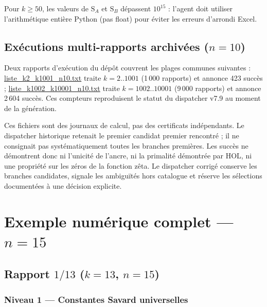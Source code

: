 \documentclass[11pt,a4paper]{article}
\newcommand{\SA}{\mathrm{S}_A}
\newcommand{\SB}{\mathrm{S}_B}
\begin{document}
\begin{boitealerte}
Pour $k \ge 50$, les valeurs de $\SA$ et $\SB$ dépassent $10^{15}$ : l'agent
doit utiliser l'arithmétique entière Python (pas float) pour éviter les erreurs
d'arrondi Excel.
\end{boitealerte}

\subsection{Exécutions multi-rapports archivées ($n=10$)}

Deux rapports d'exécution du dépôt couvrent les plages communes suivantes :
\url{liste_k2_k1001_n10.txt} traite $k=2..1001$ (1\,000 rapports) et
annonce 423 succès ; \url{liste_k1002_k10001_n10.txt} traite
$k=1002..10001$ (9\,000 rapports) et annonce 2\,604 succès. Ces compteurs
reproduisent le statut du dispatcher v7.9 au moment de la génération.

\begin{boitealerte}
Ces fichiers sont des journaux de calcul, pas des certificats indépendants.
Le dispatcher historique retenait le premier candidat premier rencontré ; il
ne consignait pas systématiquement toutes les branches premières. Les succès
ne démontrent donc ni l'unicité de l'ancre, ni la primalité démontrée par HOL,
ni une propriété sur les zéros de la fonction zêta. Le dispatcher corrigé
conserve les branches candidates, signale les ambiguïtés hors catalogue et
réserve les sélections documentées à une décision explicite.
\end{boitealerte}

\section{Exemple numérique complet --- $n = 15$}

\subsection{Rapport $1/13$ ($k = 13$, $n = 15$)}

\subsubsection{Niveau 1 --- Constantes Savard universelles}
\end{document}
